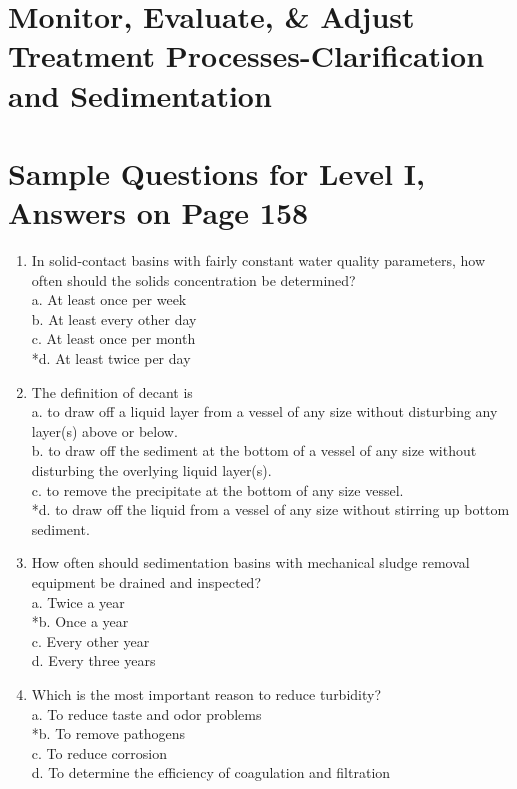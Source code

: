 \section{Monitor, Evaluate, \& Adjust Treatment Processes-Clarification and Sedimentation}
\section{Sample Questions for Level I, Answers on Page 158}
\begin{enumerate}[label=TI\arabic*]
\item In solid-contact basins with fairly constant water quality parameters, how often should the solids concentration be determined?\\
a. At least once per week\\
b. At least every other day\\
c. At least once per month\\
*d. At least twice per day\\
\item The definition of decant is\\
a. to draw off a liquid layer from a vessel of any size without disturbing any layer(s) above or below.\\
b. to draw off the sediment at the bottom of a vessel of any size without disturbing the overlying liquid layer(s).\\
c. to remove the precipitate at the bottom of any size vessel.\\
*d. to draw off the liquid from a vessel of any size without stirring up bottom sediment.\\
\item How often should sedimentation basins with mechanical sludge removal equipment be drained and inspected?\\
a. Twice a year\\
*b. Once a year\\
c. Every other year\\
d. Every three years\\
\item Which is the most important reason to reduce turbidity?\\
a. To reduce taste and odor problems\\
*b. To remove pathogens\\
c. To reduce corrosion\\
d. To determine the efficiency of coagulation and filtration\\
\end{enumerate}
